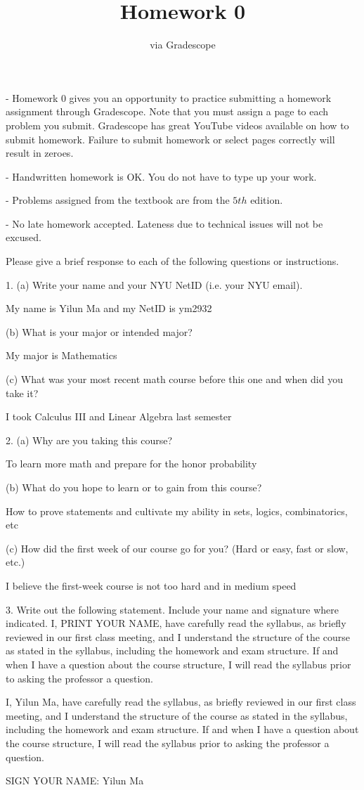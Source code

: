 \documentclass{article}
\begin{document}
\title{Homework 0}
\author{via Gradescope}

- Homework 0 gives you an opportunity to practice submitting a homework assignment through Gradescope. Note that you must assign a page to each problem you submit. Gradescope has great YouTube videos available on how to submit homework. Failure to submit homework or select pages correctly will result in zeroes.

- Handwritten homework is OK. You do not have to type up your work.

- Problems assigned from the textbook are from the $5th$ edition.

- No late homework accepted. Lateness due to technical issues will not be excused.

Please give a brief response to each of the following questions or instructions.

1. (a) Write your name and your NYU NetID (i.e. your NYU email).

{\color{blue} My name is Yilun Ma and my NetID is ym2932}

(b) What is your major or intended major?

{\color{blue} My major is Mathematics}

(c) What was your most recent math course before this one and when did you take it?

{\color{blue} I took Calculus III and Linear Algebra last semester}

2. (a) Why are you taking this course?

{\color{blue} To learn more math and prepare for the honor probability}

(b) What do you hope to learn or to gain from this course?

{\color{blue} How to prove statements and cultivate my ability in sets, logics, combinatorics, etc}

(c) How did the first week of our course go for you? (Hard or easy, fast or slow, etc.)

{\color{blue} I believe the first-week course is not too hard and in medium speed}

3. Write out the following statement. Include your name and signature where indicated. I, PRINT YOUR NAME, have carefully read the syllabus, as briefly reviewed in our first class meeting, and I understand the structure of the course as stated in the syllabus, including the homework and exam structure. If and when I have a question about the course structure, I will read the syllabus prior to asking the professor a question.

{\color{blue}I, Yilun Ma, have carefully read the syllabus, as briefly reviewed in our first class meeting, and I understand the structure of the course as stated in the syllabus, including the homework and exam structure. If and when I have a question about the course structure, I will read the syllabus prior to asking the professor a question.}

SIGN YOUR NAME:  Yilun Ma
\end{document}
